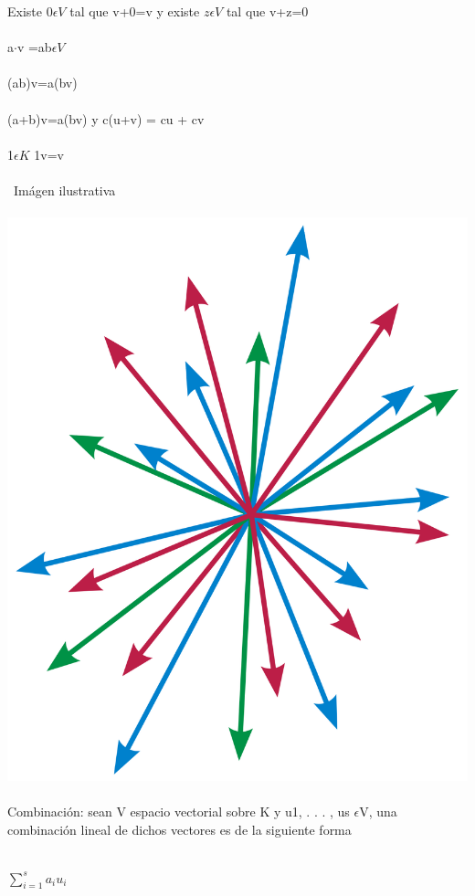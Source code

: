 \documentclass[a4paper,10pt]{article}
\begin{document}
Existe $0\epsilon V$ tal que v+0=v y  existe $z\epsilon V$ tal que v+z=0 \\\\
a$ \cdot$v =ab$\epsilon V$\\\\
(ab)v=a(bv)\\\\
(a+b)v=a(bv) y c(u+v) = cu + cv\\\\
1$\epsilon K$ 1v=v\\\\\
Imágen ilustrativa\\\\
\includegraphics[scale=0.1]{1200px-Vector_space_illust.svg.png}\\\\
Combinación: sean  V espacio vectorial sobre K y u1, . . . , us $\epsilon$V, una combinación lineal de dichos vectores es de la siguiente forma\\\\
 \centerline{$\sum_{i=1}^{s} a_i u_i$}\\\\
\end{document}
